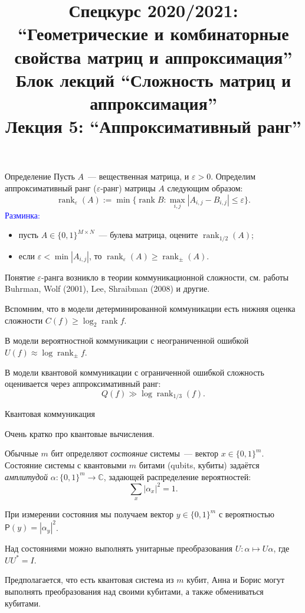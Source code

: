 \documentclass[handout]{beamer}
\title{Спецкурс 2020/2021: ``Геометрические и комбинаторные свойства матриц и
аппроксимация'' \\ Блок лекций ``Сложность матриц и аппроксимация'' \\ Лекция 5:
``Аппроксимативный ранг''}
\renewcommand\le{\leqslant}
\renewcommand\ge{\geqslant}
\newcommand\eps{\varepsilon}
\renewcommand\P{\mathsf P}
\DeclareMathOperator{\rank}{rank}
\begin{document}
\maketitle


\begin{frame}{Определение}
Пусть $A$~--- вещественная матрица, и $\eps>0$. Определим аппроксимативный ранг
    ($\eps$-ранг) матрицы $A$ следующим образом:\pause
$$
\rank_\eps(A) := \min\{\rank B\colon \max_{i,j}|A_{i,j}-B_{i,j}| \le \eps\}.
$$
\pause
    \textcolor{blue}{Разминка:}\begin{itemize}\pause
        \item пусть $A\in\{0,1\}^{M\times N}$~--- булева матрица, оцените
            $\rank_{1/2}(A)$;\pause
        \item если $\eps<\min|A_{i,j}|$, то $\rank_\eps(A)\ge \rank_\pm(A)$. 
    \end{itemize}
    \pause

    Понятие $\eps$-ранга возникло в теории коммуникационной сложности, см. работы
    Buhrman, Wolf (2001), Lee, Shraibman (2008) и другие.
    \pause\vspace{5pt}

    Вспомним, что в модели детерминированной коммуникации есть нижняя оценка
    сложности $C(f)\ge\log_2\rank f$.
    \pause

    В модели вероятностной коммуникации с неограниченной ошибкой $U(f) \approx
    \log \rank_\pm f$.
    \pause


    В модели квантовой коммуникации с ограниченной ошибкой сложность оценивается
    через аппроксимативный ранг:
    $$
    Q(f) \gg \log \rank_{1/3}(f).
    $$

\end{frame}

\begin{frame}{Квантовая коммуникация}

    Очень кратко про квантовые вычисления.
    \pause\vspace{5pt}

    Обычные $m$ бит определяют \textit{состояние} системы~--- вектор
    $x\in\{0,1\}^m$.
    \pause
    Состояние системы с квантовыми $m$ битами (qubits, кубиты) задаётся
    \textit{амплитудой} $\alpha\colon\{0,1\}^m\to\mathbb C$, задающей
    распределение вероятностей:
    $$
    \sum_x |\alpha_x|^2 = 1.
    $$
    \pause

    При измерении состояния мы получаем вектор $y\in\{0,1\}^m$ с вероятностью
    $\P(y)=|\alpha_y|^2$.
    \pause\vspace{5pt}

    Над состояниями можно выполнять унитарные преобразования
    $U\colon\alpha\mapsto U\alpha$, где $UU^*=I$.
    \pause\vspace{5pt}

    Предполагается, что есть квантовая система из $m$ кубит, Анна и Борис могут
    выполнять преобразования над своими кубитами, а также обмениваться кубитами.

\end{frame}
\end{document}
